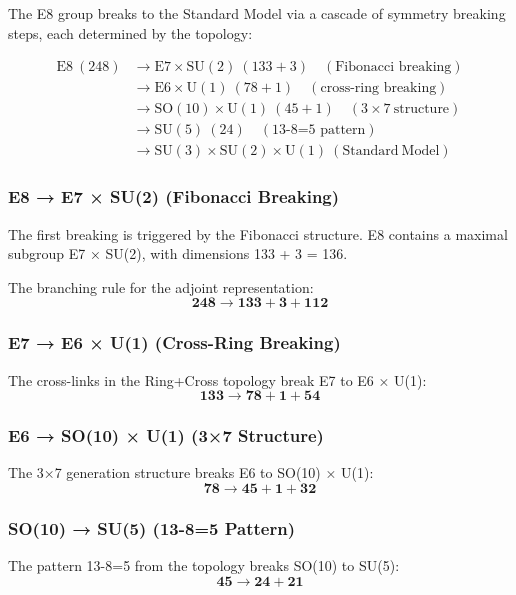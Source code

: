 \documentclass[12pt,a4paper]{article}
\begin{document}
The E8 group breaks to the Standard Model via a cascade of symmetry breaking steps, each determined by the topology:

\begin{align*}
\mathrm{E8\ (248)} &\rightarrow \mathrm{E7 \times SU(2)}\ (133 + 3) \quad (\text{Fibonacci breaking}) \\
&\rightarrow \mathrm{E6 \times U(1)}\ (78 + 1) \quad (\text{cross-ring breaking}) \\
&\rightarrow \mathrm{SO(10) \times U(1)}\ (45 + 1) \quad (3\times7\ \text{structure}) \\
&\rightarrow \mathrm{SU(5)}\ (24) \quad (\text{13-8=5 pattern}) \\
&\rightarrow \mathrm{SU(3) \times SU(2) \times U(1)}\ (\mathrm{Standard\ Model})
\end{align*}

\subsubsection{E8 → E7 × SU(2) (Fibonacci Breaking)}
The first breaking is triggered by the Fibonacci structure. E8 contains a maximal subgroup E7 × SU(2), with dimensions 133 + 3 = 136.

The branching rule for the adjoint representation:
\begin{equation}
\mathbf{248} \rightarrow \mathbf{133} + \mathbf{3} + \mathbf{112}
\end{equation}

\subsubsection{E7 → E6 × U(1) (Cross-Ring Breaking)}
The cross-links in the Ring+Cross topology break E7 to E6 × U(1):
\begin{equation}
\mathbf{133} \rightarrow \mathbf{78} + \mathbf{1} + \mathbf{54}
\end{equation}

\subsubsection{E6 → SO(10) × U(1) (3×7 Structure)}
The 3×7 generation structure breaks E6 to SO(10) × U(1):
\begin{equation}
\mathbf{78} \rightarrow \mathbf{45} + \mathbf{1} + \mathbf{32}
\end{equation}

\subsubsection{SO(10) → SU(5) (13-8=5 Pattern)}
The pattern 13-8=5 from the topology breaks SO(10) to SU(5):
\begin{equation}
\mathbf{45} \rightarrow \mathbf{24} + \mathbf{21}
\end{equation}
\end{document}
